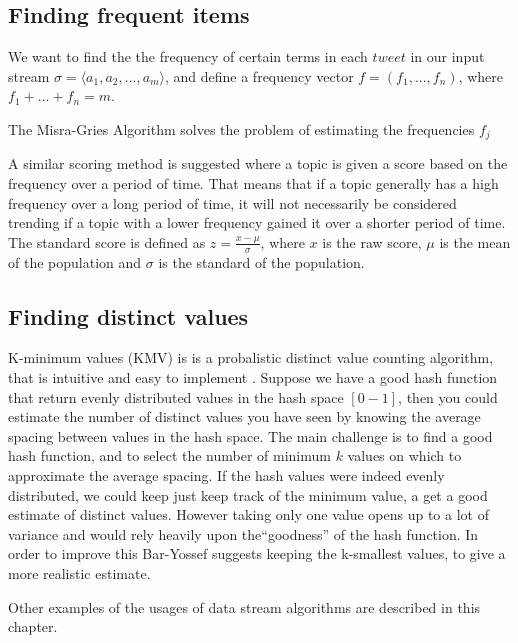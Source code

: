 \documentclass[12pt]{article}
\begin{document}
\subsection{Finding frequent items}
We want to find the the frequency of certain terms in each $tweet$ in our input stream $\sigma = \langle a_{1}, a_{2},...,a_{m}\rangle$, and define a frequency vector $f = (f_{1},...,f_{n})$, where $f_{1} + ... + f_{n} = m$. 

The Misra-Gries Algorithm solves the problem of estimating the frequencies $f_{j}$ \cite{Amit}

A similar scoring method is suggested where a topic is given a score based on the frequency over a period of time. That means that if a topic generally has a high frequency over a long period of time, it will not necessarily be considered trending if a topic with a lower frequency gained it over a shorter period of time. The standard score is defined as $z = \frac{x - \mu}{\sigma}$, where $x$ is the raw score, $\mu$ is the mean of the population and $\sigma$ is the standard of the population.

\subsection{Finding distinct values}
K-minimum values (KMV) is is a probalistic distinct value counting algorithm, that is intuitive and easy to implement \cite{kmv}. Suppose we have a good hash function that return evenly distributed values in the hash space $[0-1]$, then you could estimate the number of distinct values you have seen by knowing the average spacing between values in the hash space. The main challenge is to find a good hash function, and to select the number of minimum $k$ values on which to approximate the average spacing. If the hash values were indeed evenly distributed, we could keep just keep track of the minimum value, a get a good estimate of distinct values. However taking only one value opens up to a lot of variance and would rely heavily upon the``goodness'' of the hash function. In order to improve this Bar-Yossef\cite{Bar-Yossef} suggests keeping the k-smallest values, to give a more realistic estimate.
   
Other examples of the usages of data stream algorithms are described in this chapter.
\end{document}
